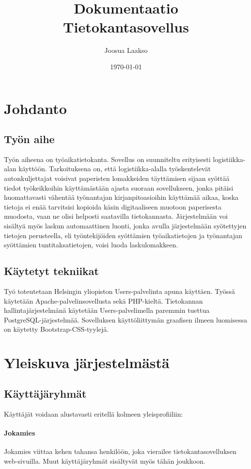 \documentclass[a4paper, 12pt finnish]{article}
\title{Dokumentaatio \\ \large Tietokantasovellus}
\author{Joosua Laakso}
\date{\today}
\begin{document}
\maketitle

\section{Johdanto} 
\subsection{Työn aihe} Työn aiheena on työaikatietokanta. Sovellus on
suunniteltu erityisesti logistiikka-alan käyttöön. Tarkoituksena on, että
logistiikka-alalla työskentelevät autonkuljettajat voisivat paperisten
lomakkeiden täyttämisen sijaan syöttää tiedot työkeikkoihin käyttämästään
ajasta suoraan sovellukseen, jonka pitäisi huomattavasti vähentää 
työnantajan kirjanpitoasioihin käyttämää aikaa, koska tietoja ei enää
tarvitsisi kopioida käsin digitaaliseen muotoon paperisesta muodosta, vaan
ne olisi helposti saatavilla tietokannasta. Järjestelmään voi sisältyä
myös laskun automaattinen luonti, jonka avulla järjestelmään syötettyjen
tietojen perusteella, eli työntekijöiden syöttämien työaikatietojen ja 
työnantajan syöttämien tuntitaksatietojen, voisi luoda laskulomakkeen.

\subsection{Käytetyt tekniikat} Työ toteutetaan Helsingin yliopiston 
Users-palvelinta apuna käyttäen. Työssä käytetään Apache-palvelinsovellusta
sekä PHP-kieltä. Tietokannan hallintajärjestelmänä käytetään
Users-palvelimella paremmin tuettua PostgreSQL-järjestelmää. Sovelluksen
käyttöliittymän graafisen ilmeen luomisessa on käytetty
Bootstrap-CSS-tyylejä.

\newpage
\tableofcontents
\newpage

\section{Yleiskuva järjestelmästä}
\subsection{Käyttäjäryhmät} Käyttäjät voidaan alustavasti eritellä kolmeen
yleisprofiiliin:
\paragraph{Jokamies} Jokamies viittaa kehen tahansa henkilöön, joka
vierailee tietokantasovelluksen web-sivuilla. Muut käyttäjäryhmät 
sisältyvät myös tähän joukkoon.
\end{document}
